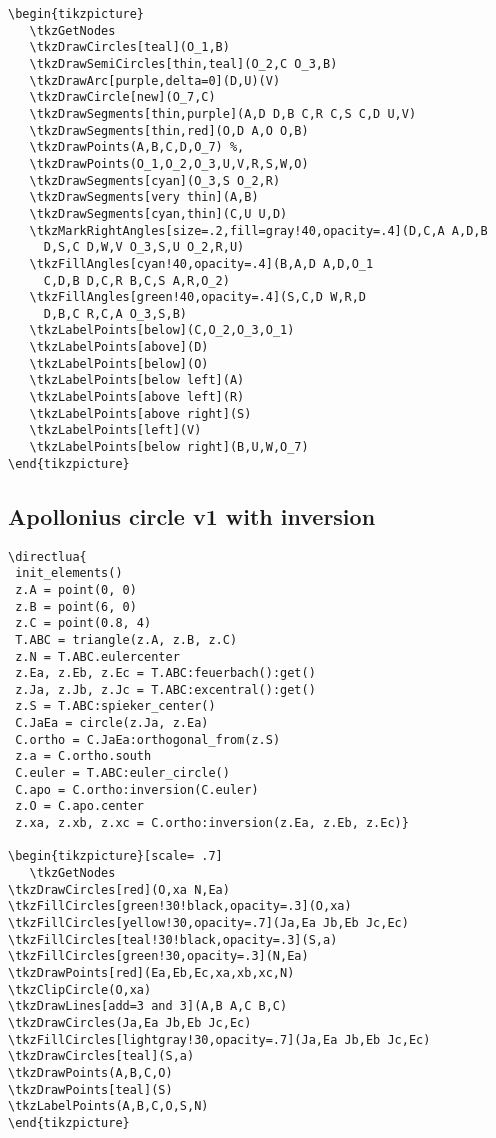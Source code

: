\begin{verbatim}
\begin{tikzpicture}
   \tkzGetNodes
   \tkzDrawCircles[teal](O_1,B)
   \tkzDrawSemiCircles[thin,teal](O_2,C O_3,B)
   \tkzDrawArc[purple,delta=0](D,U)(V)
   \tkzDrawCircle[new](O_7,C)
   \tkzDrawSegments[thin,purple](A,D D,B C,R C,S C,D U,V)
   \tkzDrawSegments[thin,red](O,D A,O O,B)
   \tkzDrawPoints(A,B,C,D,O_7) %,
   \tkzDrawPoints(O_1,O_2,O_3,U,V,R,S,W,O)
   \tkzDrawSegments[cyan](O_3,S O_2,R)
   \tkzDrawSegments[very thin](A,B)
   \tkzDrawSegments[cyan,thin](C,U U,D)
   \tkzMarkRightAngles[size=.2,fill=gray!40,opacity=.4](D,C,A A,D,B
     D,S,C D,W,V O_3,S,U O_2,R,U)
   \tkzFillAngles[cyan!40,opacity=.4](B,A,D A,D,O_1
     C,D,B D,C,R B,C,S A,R,O_2)
   \tkzFillAngles[green!40,opacity=.4](S,C,D W,R,D
     D,B,C R,C,A O_3,S,B)
   \tkzLabelPoints[below](C,O_2,O_3,O_1)
   \tkzLabelPoints[above](D)
   \tkzLabelPoints[below](O)
   \tkzLabelPoints[below left](A)
   \tkzLabelPoints[above left](R)
   \tkzLabelPoints[above right](S)
   \tkzLabelPoints[left](V)
   \tkzLabelPoints[below right](B,U,W,O_7)
\end{tikzpicture}
\end{verbatim}

\subsection{Apollonius circle v1 with inversion}
\label{sub:apollonius_circle_v1_with_inversion}
\begin{verbatim}
\directlua{
 init_elements()
 z.A = point(0, 0)
 z.B = point(6, 0)
 z.C = point(0.8, 4)
 T.ABC = triangle(z.A, z.B, z.C)
 z.N = T.ABC.eulercenter
 z.Ea, z.Eb, z.Ec = T.ABC:feuerbach():get()
 z.Ja, z.Jb, z.Jc = T.ABC:excentral():get()
 z.S = T.ABC:spieker_center()
 C.JaEa = circle(z.Ja, z.Ea)
 C.ortho = C.JaEa:orthogonal_from(z.S)
 z.a = C.ortho.south
 C.euler = T.ABC:euler_circle()
 C.apo = C.ortho:inversion(C.euler)
 z.O = C.apo.center
 z.xa, z.xb, z.xc = C.ortho:inversion(z.Ea, z.Eb, z.Ec)}

\begin{tikzpicture}[scale= .7]
   \tkzGetNodes
\tkzDrawCircles[red](O,xa N,Ea)
\tkzFillCircles[green!30!black,opacity=.3](O,xa)
\tkzFillCircles[yellow!30,opacity=.7](Ja,Ea Jb,Eb Jc,Ec)
\tkzFillCircles[teal!30!black,opacity=.3](S,a)
\tkzFillCircles[green!30,opacity=.3](N,Ea)
\tkzDrawPoints[red](Ea,Eb,Ec,xa,xb,xc,N)
\tkzClipCircle(O,xa)
\tkzDrawLines[add=3 and 3](A,B A,C B,C)
\tkzDrawCircles(Ja,Ea Jb,Eb Jc,Ec)
\tkzFillCircles[lightgray!30,opacity=.7](Ja,Ea Jb,Eb Jc,Ec)
\tkzDrawCircles[teal](S,a)
\tkzDrawPoints(A,B,C,O)
\tkzDrawPoints[teal](S)
\tkzLabelPoints(A,B,C,O,S,N)
\end{tikzpicture}
\end{verbatim}

